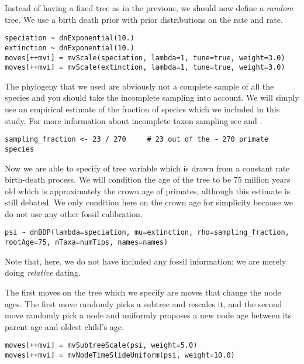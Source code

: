 Instead of having a fixed tree as in the previous, we should now define a \emph{random} tree. We use a birth death prior with prior distributions on the  rate and  rate.
{\tt \small \begin{snugshade*}
\begin{lstlisting}
speciation ~ dnExponential(10.)
extinction ~ dnExponential(10.)
moves[++mvi] = mvScale(speciation, lambda=1, tune=true, weight=3.0)
moves[++mvi] = mvScale(extinction, lambda=1, tune=true, weight=3.0)
\end{lstlisting}
\end{snugshade*}}
The phylogeny that we used are obviously not a complete sample of all the species and you should take the incomplete sampling into account. We will simply use an empirical estimate of the fraction of species which we included in this study. For more information about incomplete taxon sampling see \cite{Hohna2011} and \cite{Hohna2014a}. 
{\tt \small \begin{snugshade*}
\begin{lstlisting}
sampling_fraction <- 23 / 270     # 23 out of the ~ 270 primate species
\end{lstlisting}
\end{snugshade*}}
Now we are able to specify of tree variable  which is drawn from a constant rate birth-death process. We will condition the age of the tree to be 75 million years old which is approximately the crown age of primates, although this estimate is still debated. We only condition here on the crown age for simplicity because we do not use any other fossil calibration.
{\tt \small \begin{snugshade*}
\begin{lstlisting}
psi ~ dnBDP(lambda=speciation, mu=extinction, rho=sampling_fraction, rootAge=75, nTaxa=numTips, names=names)
\end{lstlisting}
\end{snugshade*}}
Note that, here, we do not have included any fossil information: we are merely doing \emph{relative} dating. 

The first moves on the tree which we specify are moves that change the node ages. The first move randomly picks a subtree and rescales it, and the second move randomly pick a node and uniformly proposes a new node age between its parent age and oldest child's age.
{\tt \small \begin{snugshade*}
\begin{lstlisting}
moves[++mvi] = mvSubtreeScale(psi, weight=5.0)
moves[++mvi] = mvNodeTimeSlideUniform(psi, weight=10.0)
\end{lstlisting}
\end{snugshade*}}

